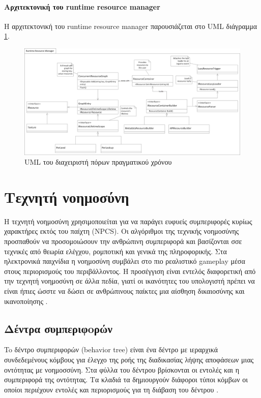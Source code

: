 \paragraph{Αρχιτεκτονική του runtime resource manager}
Η αρχιτεκτονική του runtime resource manager παρουσιάζεται στο \gls{UML} διάγραμμα \ref{fig:runtime_resource_uml}.
\begin{figure}[h!]
	\centering
	\includegraphics[width=165mm]{Images/runtime_resource_manager}
	\caption{UML του διαχειριστή πόρων πραγματικού χρόνου}
	\label{fig:runtime_resource_uml}
\end{figure}

\section{Τεχνητή νοημοσύνη}
Η τεχνητή νοημοσύνη χρησιμοποιείται για να παράγει ευφυείς συμπεριφορές κυρίως χαρακτήρες εκτός του παίχτη (NPCS). Οι αλγόριθμοι της τεχνικής νοημοσύνης προσπαθούν να προσομοιώσουν την ανθρώπινη συμπεριφορά και βασίζονται σσε τεχνικές από θεωρία ελέγχου, ρομποτική και γενικά της πληροφορικής. Στα ηλεκτρονικά παιχνίδια η νοημοσύνη συμβάλει στο πιο ρεαλιστικό gameplay μέσα στους περιορισμούς του περιβάλλοντος. Η προσέγγιση είναι εντελός διαφορετική από την τεχνητή νοημοσύνη σε άλλα πεδία, γιατί οι ικανότητες του υπολογιστή πρέπει να είναι ήπιες ώσστε να δώσει σε ανθρώπινους παίκτες μια αίσθηση δικαιοσύνης και ικανοποίησης \cite{Sousa:2002:GPO:580160}.
 
\subsection{Δέντρα συμπεριφoρών}	
To δέντρο συμπεριφορών (behavior tree) είναι ένα δέντρο με ιεραρχικά συνδεδεμένους κόμβους για έλεγχο της ροής της διαδικασίας λήψης αποφάσεων μιας οντότητας με νοημοσσύνη. Στα φύλλα του δέντρου βρίσκονται οι εντολές και η συμπεριφορά της οντότητας. Τα κλαδιά τα δημιουργούν διάφοροι τύποι κόμβων οι οποίοι περιέχουν εντολές και περιορισμούς για τη διάβαση του δέντρου \cite{champandard2007understanding}.

